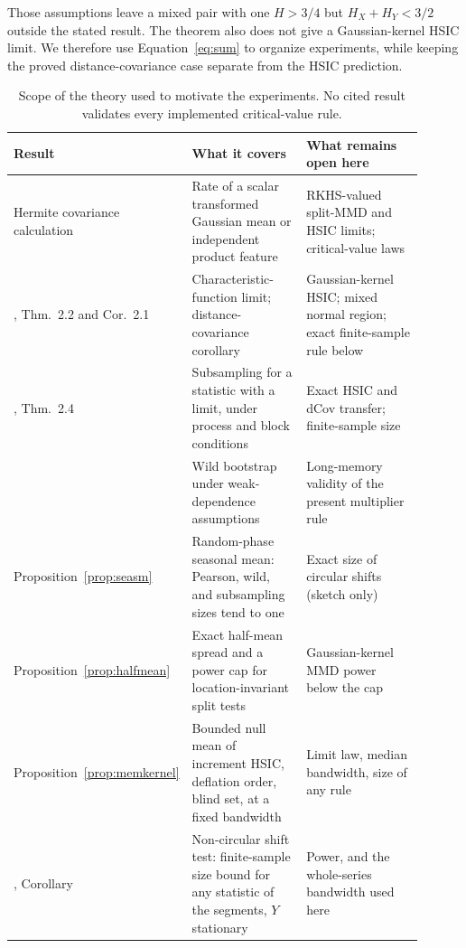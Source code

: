 \documentclass[11pt]{article}
\theoremstyle{remark}
\begin{document}
Those assumptions leave a mixed pair with one $H>3/4$ but $H_X+H_Y<3/2$ outside the stated result. The theorem also does not give a Gaussian-kernel HSIC limit. We therefore use Equation~\eqref{eq:sum} to organize experiments, while keeping the proved distance-covariance case separate from the HSIC prediction.

\begin{table}[H]
\centering\small
\caption{Scope of the theory used to motivate the experiments. No cited result validates every implemented critical-value rule.}\label{tab:scope}
\begin{tabular}{@{}p{0.24\linewidth}p{0.31\linewidth}p{0.35\linewidth}@{}}
\toprule
Result & What it covers & What remains open here \\
\midrule
Hermite covariance calculation & Rate of a scalar transformed Gaussian mean or independent product feature & RKHS-valued split-MMD and HSIC limits; critical-value laws \\
\citet{betken2021ldr}, Thm.~2.2 and Cor.~2.1 & Characteristic-function limit; distance-covariance corollary & Gaussian-kernel HSIC; mixed normal region; exact finite-sample rule below \\
\citet{betken2021ldr}, Thm.~2.4 & Subsampling for a statistic with a limit, under process and block conditions & Exact HSIC and dCov transfer; finite-sample size \\
\citet{chwialkowski2014wild} & Wild bootstrap under weak-dependence assumptions & Long-memory validity of the present multiplier rule \\
Proposition~\ref{prop:seasm} & Random-phase seasonal mean: Pearson, wild, and subsampling sizes tend to one & Exact size of circular shifts (sketch only) \\
Proposition~\ref{prop:halfmean} & Exact half-mean spread and a power cap for location-invariant split tests & Gaussian-kernel MMD power below the cap \\
Proposition~\ref{prop:memkernel} & Bounded null mean of increment HSIC, deflation order, blind set, at a fixed bandwidth & Limit law, median bandwidth, size of any rule \\
\citet{harris2020shift}, Corollary & Non-circular shift test: finite-sample size bound for any statistic of the segments, $Y$ stationary & Power, and the whole-series bandwidth used here \\
\bottomrule
\end{tabular}
\end{table}
\end{document}
